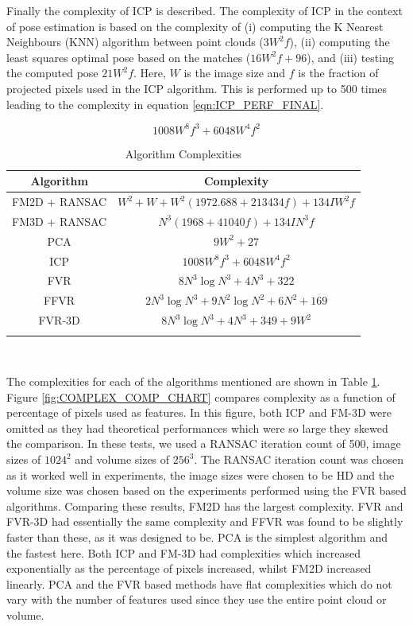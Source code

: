 Finally the complexity of ICP is described. The complexity of ICP in the context of pose estimation is based on the complexity of (i) computing the K Nearest Neighbours (KNN) algorithm between point clouds ($3W^2f$), (ii) computing the least squares optimal pose based on the matches ($16W^2f + 96$), and (iii) testing the computed pose $21W^2f$. Here, $W$ is the image size and $f$ is the fraction of projected pixels used in the ICP algorithm. This is performed up to 500 times leading to the complexity in equation \ref{eqn:ICP_PERF_FINAL}.

\begin{equation} \label{eqn:ICP_PERF_FINAL}
1008W^8f^3 + 6048W^4f^2
\end{equation}

\begin{table}[!t]
\centering
\caption{Algorithm Complexities}
\begin{tabular}{cc}\hline
\textbf{Algorithm} & \textbf{Complexity}\\ \hline
FM2D + RANSAC & $W^2 + W + W^2(1972.688 + 213434f) + 134IW^2f$\\
FM3D + RANSAC & $N^3(1968 + 41040f) + 134IN^3f$\\
PCA & $9W^2 + 27$\\
ICP & $1008W^8f^3 + 6048W^4f^2$\\
FVR & $8N^3\log{N^3} + 4N^3 + 322$\\
FFVR & $2N^3\log{N^3} + 9N^2\log{N^2} + 6N^2 + 169$\\
FVR-3D & $8N^3\log{N^3} + 4N^3 + 349 + 9W^2$\\
\\
\end{tabular}
\\[10pt]
\label{table:ALG_COMPLEX_TBL}
\end{table}

The complexities for each of the algorithms mentioned are shown in Table \ref{table:ALG_COMPLEX_TBL}. Figure \ref{fig:COMPLEX_COMP_CHART} compares complexity as a function of percentage of pixels used as features. In this figure, both ICP and FM-3D were omitted as they had theoretical performances which were so large they skewed the comparison. In these tests, we used a RANSAC iteration count of 500, image sizes of $1024^2$ and volume sizes of $256^3$. The RANSAC iteration count was chosen as it worked well in experiments, the image sizes were chosen to be HD and the volume size was chosen based on the experiments performed using the FVR based algorithms. Comparing these results, FM2D has the largest complexity. FVR and FVR-3D had essentially the same complexity and FFVR was found to be slightly faster than these, as it was designed to be. PCA is the simplest algorithm and the fastest here. Both ICP and FM-3D had complexities which increased exponentially as the percentage of pixels increased, whilst FM2D increased linearly. PCA and the FVR based methods have flat complexities which do not vary with the number of features used since they use the entire point cloud or volume. \\


